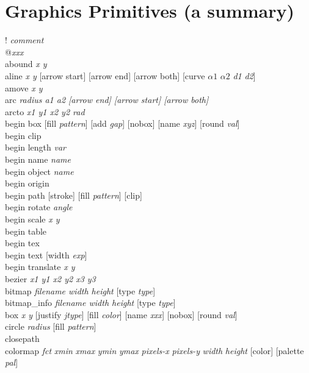 \section{Graphics Primitives (a summary)}
{\sf ! {\it comment}} \\
{\sf @{\it xxx}} \\
{\sf abound {\it x y}} \\
{\sf aline {\it x y} [arrow start] [arrow end] [arrow both] [curve {\it $\alpha1$} {\it $\alpha2$} {\it d1} {\it d2}]} \\
{\sf amove {\it x y}}  \\
{\sf arc {\it radius a1 a2 [arrow end] [arrow start] [arrow both]}} \\
{\sf arcto {\it x1 y1 x2 y2 rad}}  \\
{\sf begin box [fill {\it pattern}] [add {\it gap}] [nobox] [name {\it xyz}] [round {\it val}]}  \\
{\sf begin clip }  \\
{\sf begin length {\it var}} \\
{\sf begin name {\it name}}  \\
{\sf begin object {\it name}}  \\
{\sf begin origin}  \\
{\sf begin path [stroke] [fill {\it pattern}] [clip]}  \\
{\sf begin rotate {\it angle}}  \\
{\sf begin scale {\it x y}}  \\
{\sf begin table }  \\
{\sf begin tex } \\
{\sf begin text [width {\it exp}] }    \\
{\sf begin translate {\it x y}}  \\
{\sf bezier {\it x1 y1 x2 y2 x3 y3}}  \\
{\sf bitmap {\it filename width height} [type {\it type}]} \\
{\sf bitmap\_info {\it filename width height} [type {\it type}]} \\
{\sf box {\it x y} [justify {\it jtype}] [fill {\it color}] [name {\it xxx}] [nobox] [round {\it val}]} \\
{\sf circle {\it radius} [fill {\it pattern}]}  \\
{\sf closepath }  \\
{\sf colormap {\it fct} {\it xmin} {\it xmax} {\it ymin} {\it ymax} {\it pixels-x} {\it pixels-y} {\it width} {\it height} [color] [palette {\it pal}]} \\
